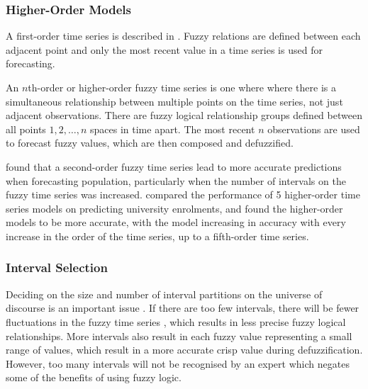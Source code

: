 \documentclass[12pt]{article}
\theoremstyle{definition}
\begin{document}
\subsubsection{Higher-Order Models}

\label{higher}

A first-order time series is described in . Fuzzy relations are defined between each adjacent point and only the most recent value in a time series is used for forecasting.

An $n$th-order or higher-order fuzzy time series is one where where there is a simultaneous relationship between multiple points on the time series, not just adjacent observations. There are fuzzy logical relationship groups defined between all points $1,2,\ldots,n$ spaces in time apart. The most recent $n$ observations are used to forecast fuzzy values, which are then composed and defuzzified.

\cite{tsai1999study} found that a second-order fuzzy time series lead to more accurate predictions when forecasting population, particularly when the number of intervals on the fuzzy time series was increased. \cite{tsai2000forecasting} compared the performance of 5 higher-order time series models on predicting university enrolments, and found the higher-order models to be more accurate, with the model increasing in accuracy with every increase in the order of the time series, up to a fifth-order time series.

\subsubsection{Interval Selection}

\label{interval}

Deciding on the size and number of interval partitions on the universe of discourse is an important issue \citep{Huarng2001effective,  huarng2006ratio}. If there are too few intervals, there will be fewer fluctuations in the fuzzy time series \citep{Huarng2001effective}, which results in less precise fuzzy logical relationships. More intervals also result in each fuzzy value representing a small range of values, which result in a more accurate crisp value during defuzzification. However, too many intervals will not be recognised by an expert which negates some of the benefits of using fuzzy logic.
\end{document}
